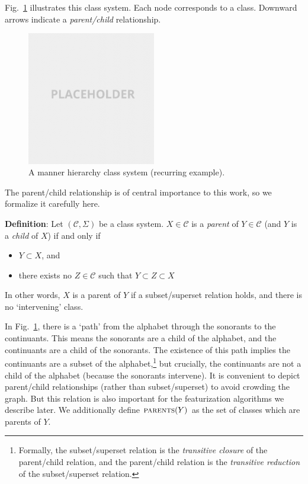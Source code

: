 \documentclass[11pt, oneside]{article}   	%
\begin{document}
\noindent Fig.~\ref{fig:manner_input} illustrates this class system. Each node corresponds to a class. Downward arrows indicate a \textit{parent/child} relationship.

\begin{figure}[h]
  \centering
  \includegraphics[width=0.5\textwidth]{placeholder.png}
  \caption{A manner hierarchy class system (recurring example).}
  \label{fig:manner_input}
\end{figure}

\vspace{\baselineskip} \noindent The parent/child relationship is of central importance to this work, so we formalize it carefully here.

\vspace{\baselineskip} \noindent \textbf{Definition}: Let $(\mathcal C, \Sigma)$ be a class system. $X \in \mathcal C$ is a \textit{parent} of $Y \in \mathcal C$ (and $Y$ is a \textit{child} of $X$) if and only if \begin{itemize}
    \item $Y \subset X$, and
    \item there exists no $Z \in \mathcal C$ such that $Y \subset Z \subset X$
    \end{itemize}
In other words, $X$ is a parent of $Y$ if a subset/superset relation holds, and there is no `intervening' class. 

In Fig.~\ref{fig:manner_input}, there is a `path' from the alphabet through the sonorants to the continuants. This means the sonorants are a child of the alphabet, and the continuants are a child of the sonorants. The existence of this path implies the continuants are a subset of the alphabet,\footnote{Formally, the subset/superset relation is the \textit{transitive closure} of the parent/child relation, and the parent/child relation is the \textit{transitive reduction} of the subset/superset relation.} but crucially, the continuants are not a child of the alphabet (because the sonorants intervene). It is convenient to depict parent/child relationships (rather than subset/superset) to avoid crowding the graph. But this relation is also important for the featurization algorithms we describe later. We additionally define $\textsc{parents}(Y)$ as the set of classes which are parents of $Y$.
\end{document}
